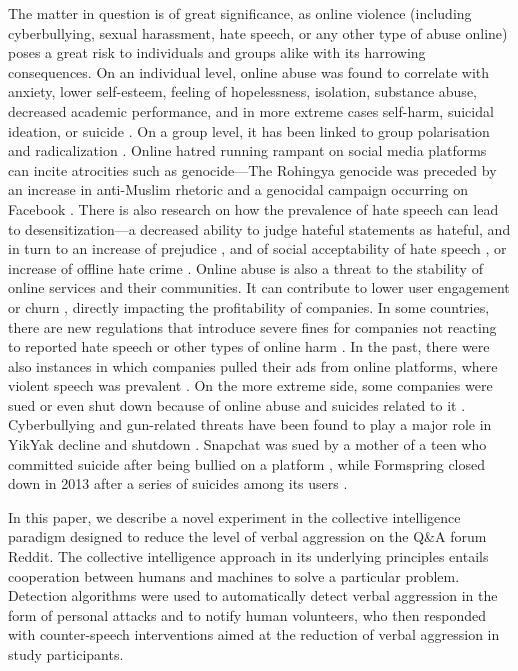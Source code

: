 \documentclass[preprint,12pt]{elsarticle}
\begin{document}
The matter in question is of great significance, as online violence (including cyberbullying, sexual harassment, hate speech, or any other type of abuse online) poses a great risk to individuals and groups alike with its harrowing consequences. On an individual level, online abuse was found to correlate with anxiety, lower self-esteem, feeling of hopelessness, isolation, substance abuse, decreased academic performance, and in more extreme cases self-harm, suicidal ideation, or suicide \citep{yang2021consequences, hinduja2010bullying, alhujailli2020affective, kowalski2013psychological}. On a group level, it has been linked to group polarisation and radicalization \citep{lee2002persuasive, williams2019hatred}. Online hatred running rampant on social media platforms can incite atrocities such as genocide---The Rohingya genocide was preceded by an increase in anti-Muslim rhetoric and a genocidal campaign occurring on Facebook \citep{fink2018dangerous}.
There is also research on how the prevalence of hate speech can lead to desensitization---a decreased ability to judge hateful statements as hateful, and in turn to an increase of prejudice \citep{soral2018exposure}, and of social acceptability of hate speech \citep{alvarez2018normative}, or increase of offline hate crime \citep{williams2020hate}. 
Online abuse is also a threat to the stability of online services and their communities. It can contribute to lower user engagement or churn \citep{urbaniak2022personal}, directly impacting the profitability of companies. In some countries, there are new regulations that introduce severe fines for companies not reacting to reported hate speech or other types of online harm \citep{tworek2021fighting, trengove2022critical}. In the past, there were also instances in which companies pulled their ads from online platforms, where violent speech was prevalent \citep{cnbc_2020}. On the more extreme side, some companies were sued or even shut down because of online abuse and suicides related to it \citep{newton_2013}. Cyberbullying and gun-related threats have been found to play a major role in YikYak decline and shutdown \citep{failory_2022}. Snapchat was sued by a mother of a teen who committed suicide after being bullied on a platform \citep{los_angeles_times_2021}, while Formspring closed down in 2013 after a series of suicides among its users \citep{seifert_2013}.

In this paper, we describe  a novel experiment in the collective intelligence paradigm designed to reduce the level of verbal aggression on the Q\&A forum Reddit. The collective intelligence approach in its underlying principles entails cooperation between humans and machines to solve a particular problem. Detection  algorithms were used to automatically detect verbal aggression in the form of personal attacks and to notify human volunteers, who then responded with counter-speech interventions aimed at the reduction of verbal aggression in  study  participants. 
\end{document}
